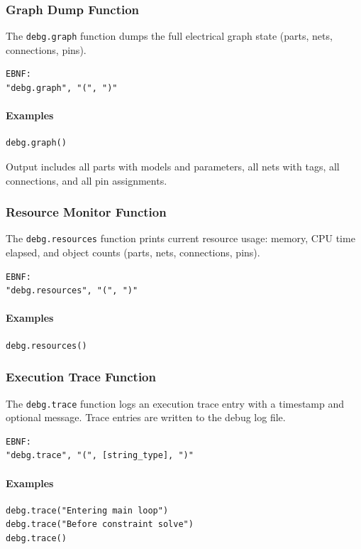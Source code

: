 \subsubsection{Graph Dump Function}
The \texttt{debg.graph} function dumps the full electrical graph state (parts, nets, connections, pins).
\begin{verbatim}
EBNF:
"debg.graph", "(", ")"
\end{verbatim}

\paragraph{Examples}
\begin{verbatim}
debg.graph()
\end{verbatim}

Output includes all parts with models and parameters, all nets with tags, all connections, and all pin assignments.

\subsubsection{Resource Monitor Function}
The \texttt{debg.resources} function prints current resource usage: memory, CPU time elapsed, and object counts (parts, nets, connections, pins).
\begin{verbatim}
EBNF:
"debg.resources", "(", ")"
\end{verbatim}

\paragraph{Examples}
\begin{verbatim}
debg.resources()
\end{verbatim}

\subsubsection{Execution Trace Function}
The \texttt{debg.trace} function logs an execution trace entry with a timestamp and optional message. Trace entries are written to the debug log file.
\begin{verbatim}
EBNF:
"debg.trace", "(", [string_type], ")"
\end{verbatim}

\paragraph{Examples}
\begin{verbatim}
debg.trace("Entering main loop")
debg.trace("Before constraint solve")
debg.trace()
\end{verbatim}

